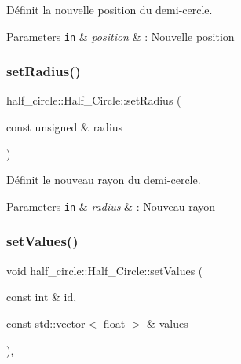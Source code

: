 Définit la nouvelle position du demi-\/cercle. 


\begin{DoxyParams}[1]{Parameters}
\mbox{\tt in}  & {\em position} & \+: Nouvelle position \\
\hline
\end{DoxyParams}
\mbox{\label{classhalf__circle_1_1_half___circle_a84af21356a58484b2de1702e64c162dd}} 
\subsubsection{\texorpdfstring{set\+Radius()}{setRadius()}}
{\footnotesize\ttfamily half\+\_\+circle\+::\+Half\+\_\+\+Circle\+::set\+Radius (\begin{DoxyParamCaption}\item[{const unsigned \&}]{radius }\end{DoxyParamCaption})}



Définit le nouveau rayon du demi-\/cercle. 


\begin{DoxyParams}[1]{Parameters}
\mbox{\tt in}  & {\em radius} & \+: Nouveau rayon \\
\hline
\end{DoxyParams}
\mbox{\label{classhalf__circle_1_1_half___circle_ab128d56c2d348524d88da23b89bf3d35}} 
\subsubsection{\texorpdfstring{set\+Values()}{setValues()}}
{\footnotesize\ttfamily void half\+\_\+circle\+::\+Half\+\_\+\+Circle\+::set\+Values (\begin{DoxyParamCaption}\item[{const int \&}]{id,  }\item[{const std\+::vector$<$ float $>$ \&}]{values }\end{DoxyParamCaption})\hspace{0.3cm}{\ttfamily [override]}, {\ttfamily [virtual]}}



